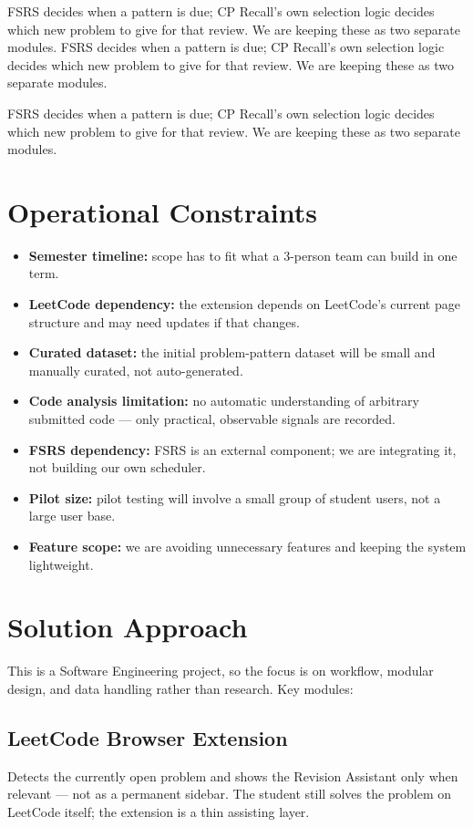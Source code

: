 \documentclass[11pt,a4paper]{article}
\begin{document}
FSRS decides when a pattern is due; CP Recall's own selection logic decides which new problem to give for that review. We are keeping these as two separate modules.
FSRS decides when a pattern is due; CP Recall's own selection logic decides which new problem to give for that review. We are keeping these as two separate modules.

FSRS decides when a pattern is due; CP Recall's own selection logic decides which new problem to give for that review. We are keeping these as two separate modules.

\section{Operational Constraints}
\begin{itemize}[leftmargin=0.7cm]
\item \textbf{Semester timeline:} scope has to fit what a 3-person team can build in one term.
\item \textbf{LeetCode dependency:} the extension depends on LeetCode's current page structure and may need updates if that changes.
\item \textbf{Curated dataset:} the initial problem-pattern dataset will be small and manually curated, not auto-generated.
\item \textbf{Code analysis limitation:} no automatic understanding of arbitrary submitted code --- only practical, observable signals are recorded.
\item \textbf{FSRS dependency:} FSRS is an external component; we are integrating it, not building our own scheduler.
\item \textbf{Pilot size:} pilot testing will involve a small group of student users, not a large user base.
\item \textbf{Feature scope:} we are avoiding unnecessary features and keeping the system lightweight.
\end{itemize}

\section{Solution Approach}
This is a Software Engineering project, so the focus is on workflow, modular design, and data handling rather than research. Key modules:

\subsection{LeetCode Browser Extension}
Detects the currently open problem and shows the Revision Assistant only when relevant --- not as a permanent sidebar. The student still solves the problem on LeetCode itself; the extension is a thin assisting layer.
\end{document}
